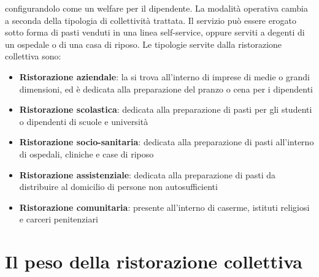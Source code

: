 \documentclass[a4paper, titlepage, 12pt, openright, twoside]{book}
\begin{document}
\begin{itemize}
											configurandolo come un welfare per il dipendente. La modalità operativa cambia a seconda della tipologia di collettività trattata.
											Il servizio può essere erogato sotto forma di pasti venduti in una linea self-service, oppure serviti a degenti di un ospedale o di una
											casa di riposo.
											Le tipologie servite dalla ristorazione collettiva sono:
											\begin{itemize}
												\item \textbf{Ristorazione aziendale}: la si trova all'interno di imprese di medie o grandi dimensioni, ed è dedicata alla preparazione
																						del pranzo o cena per i dipendenti
												\item \textbf{Ristorazione scolastica}: dedicata alla preparazione di pasti per gli studenti o dipendenti di scuole e università
												\item \textbf{Ristorazione socio-sanitaria}: dedicata alla preparazione di pasti all'interno di ospedali, cliniche e case di riposo
												\item \textbf{Ristorazione assistenziale}: dedicata alla preparazione di pasti da distribuire al domicilio di persone 
																							non autosufficienti
												\item \textbf{Ristorazione comunitaria}: presente all'interno di caserme, istituti religiosi e carceri penitenziari
											\end{itemize}
\end{itemize}

\section{Il peso della ristorazione collettiva}
\end{document}
